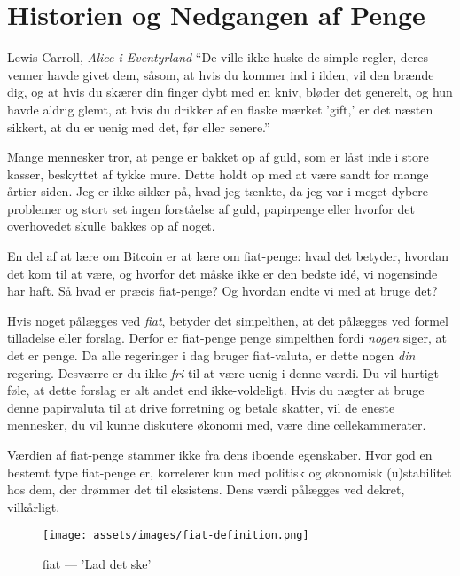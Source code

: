\chapter{Historien og Nedgangen af Penge}
\label{les:12}

\begin{chapquote}{Lewis Carroll, \textit{Alice i Eventyrland}}
\enquote{De ville ikke huske de simple regler, deres venner havde givet dem, 
såsom, at hvis du kommer ind i ilden, vil den brænde dig, og at hvis du skærer 
din finger dybt med en kniv, bløder det generelt, og hun havde aldrig glemt, 
at hvis du drikker af en flaske mærket 'gift,' er det næsten sikkert, at du 
er uenig med det, før eller senere.}
\end{chapquote}

Mange mennesker tror, at penge er bakket op af guld, som er låst inde i store 
kasser, beskyttet af tykke mure. Dette holdt op med at være sandt for mange 
årtier siden. Jeg er ikke sikker på, hvad jeg tænkte, da jeg var i meget 
dybere problemer og stort set ingen forståelse af guld, papirpenge eller 
hvorfor det overhovedet skulle bakkes op af noget.

En del af at lære om Bitcoin er at lære om fiat-penge: hvad det betyder, 
hvordan det kom til at være, og hvorfor det måske ikke er den bedste idé, 
vi nogensinde har haft. Så hvad er præcis fiat-penge? Og hvordan endte vi 
med at bruge det?

Hvis noget pålægges ved \textit{fiat}, betyder det simpelthen, at det pålægges 
ved formel tilladelse eller forslag. Derfor er fiat-penge penge simpelthen 
fordi \textit{nogen} siger, at det er penge. Da alle regeringer i dag bruger 
fiat-valuta, er dette nogen \textit{din} regering. Desværre er du ikke 
\textit{fri} til at være uenig i denne værdi. Du vil hurtigt føle, at dette 
forslag er alt andet end ikke-voldeligt. Hvis du nægter at bruge denne 
papirvaluta til at drive forretning og betale skatter, vil de eneste mennesker, 
du vil kunne diskutere økonomi med, være dine cellekammerater.

Værdien af fiat-penge stammer ikke fra dens iboende egenskaber. Hvor god en 
bestemt type fiat-penge er, korrelerer kun med politisk og økonomisk 
(u)stabilitet hos dem, der drømmer det til eksistens. Dens værdi pålægges ved 
dekret, vilkårligt.

\begin{figure}[htbp]
  \centering
  \texttt{[image: assets/images/fiat-definition.png]}
  \caption{fiat --- 'Lad det ske'}
  \label{fig:fiat-definition}
\end{figure}
  
